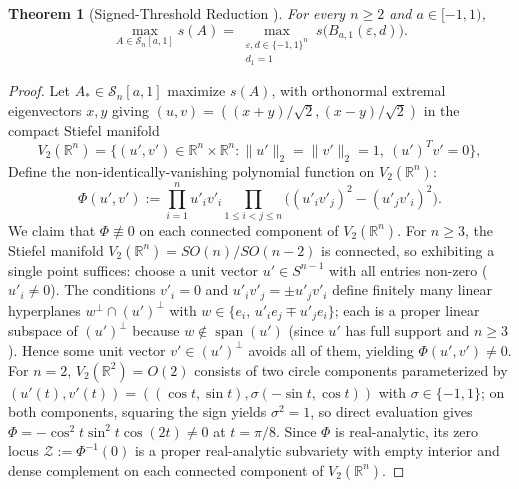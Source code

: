 \documentclass[11pt,reqno]{article}
\newtheorem{theorem}{Theorem}[section]
\theoremstyle{definition}
\newcommand{\R}{\mathbb{R}}
\begin{document}
\begin{theorem}[Signed-Threshold Reduction {\cite{holden2026a}}]\label{thm:signed-threshold}
For every $n \ge 2$ and $a \in [-1, 1)$,
\begin{equation}
\max_{A \in \mathcal{S}_n[a, 1]} s(A) = \max_{\substack{\varepsilon, d \in \{-1, 1\}^n \\ d_1 = 1}} s\bigl(B_{a, 1}(\varepsilon, d)\bigr).
\end{equation}
\end{theorem}
\begin{proof}
Let $A_* \in \mathcal{S}_n[a, 1]$ maximize $s(A)$, with orthonormal extremal eigenvectors $x, y$ giving $(u, v) = ((x+y)/\sqrt{2}, (x-y)/\sqrt{2})$ in the compact Stiefel manifold
\[
V_2(\R^n) = \{(u', v') \in \R^n \times \R^n : \|u'\|_2 = \|v'\|_2 = 1,\ (u')^T v' = 0\},
\]
Define the non-identically-vanishing polynomial function on $V_2(\R^n)$:
\[
\Phi(u', v') := \prod_{i=1}^n u'_i v'_i \prod_{1 \le i < j \le n} \bigl((u'_i v'_j)^2 - (u'_j v'_i)^2\bigr).
\]
We claim that $\Phi \not\equiv 0$ on each connected component of $V_2(\R^n)$. For $n \ge 3$, the Stiefel manifold $V_2(\R^n) = SO(n)/SO(n-2)$ is connected, so exhibiting a single point suffices: choose a unit vector $u' \in S^{n-1}$ with all entries non-zero ($u'_i \ne 0$). The conditions $v'_i = 0$ and $u'_i v'_j = \pm u'_j v'_i$ define finitely many linear hyperplanes $w^\perp \cap (u')^\perp$ with $w \in \{e_i,\, u'_i e_j \mp u'_j e_i\}$; each is a proper linear subspace of $(u')^\perp$ because $w \notin \operatorname{span}(u')$ (since $u'$ has full support and $n \ge 3$). Hence some unit vector $v' \in (u')^\perp$ avoids all of them, yielding $\Phi(u', v') \ne 0$. For $n = 2$, $V_2(\R^2) = O(2)$ consists of two circle components parameterized by $(u'(t), v'(t)) = ((\cos t, \sin t), \sigma(-\sin t, \cos t))$ with $\sigma \in \{-1, 1\}$; on both components, squaring the sign yields $\sigma^2 = 1$, so direct evaluation gives $\Phi = - \cos^2 t \sin^2 t \cos(2t) \ne 0$ at $t = \pi/8$.
Since $\Phi$ is real-analytic, its zero locus $\mathcal{Z} := \Phi^{-1}(0)$ is a proper real-analytic subvariety with empty interior and dense complement on each connected component of $V_2(\R^n)$.


\end{proof}
\end{document}

